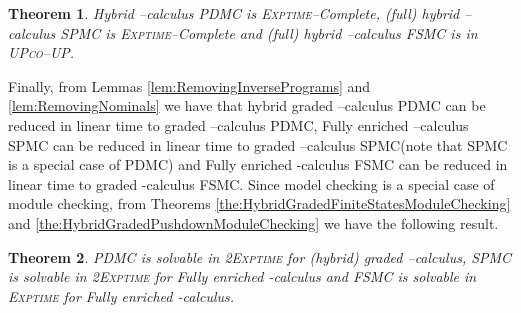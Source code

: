 \documentclass{LMCS}
\theoremstyle{plain}
\def \coUP          {\textsc{co--UP}\xspace}
\def \EXPTIME       {\textsc{Exptime}\xspace}
\def \FSMC          {\textsc{FSMC}\xspace}
\def \PDMC          {\textsc{PDMC}\xspace}
\def \SPMC          {\textsc{SPMC}\xspace}
\def \TWOEXPTIME    {\textsc{2Exptime}\xspace}
\def \UP            {{\sc UP}}
\def \UP            {\textsc{UP}\xspace}
\newtheorem{theorem}{Theorem}
\begin{document}
\begin{theorem}\label{the:FullHybridMuCalculusModelChecking}
Hybrid --calculus \PDMC is \EXPTIME--Complete, (full) hybrid
--calculus \SPMC is \EXPTIME--Complete and (full) hybrid --calculus
\FSMC is in \UP  \coUP.
\end{theorem}

Finally, from Lemmas \ref{lem:RemovingInversePrograms} and
\ref{lem:RemovingNominals} we have that hybrid graded --calculus \PDMC can
be reduced in linear time to graded --calculus \PDMC, Fully enriched
--calculus \SPMC can be reduced in linear time to graded --calculus
\SPMC (note that \SPMC is a special case of \PDMC) and Fully enriched
-calculus \FSMC can be reduced in linear time to graded -calculus
\FSMC. Since model checking is a special case of module checking, from Theorems
\ref{the:HybridGradedFiniteStatesModuleChecking} and
\ref{the:HybridGradedPushdownModuleChecking} we have the following result.

\begin{theorem}\label{the:ModelCheckingForFullyEnrichedMuCalculus}
\PDMC is solvable in \TWOEXPTIME for (hybrid) graded --calculus, \SPMC is
solvable in \TWOEXPTIME for Fully enriched -calculus and \FSMC is solvable
in \EXPTIME for Fully enriched -calculus.
\end{theorem}



\end{document}
